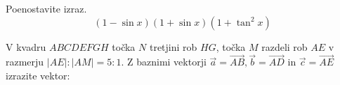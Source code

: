\documentclass[addpoints]{exam}
\begin{document}
\begin{questions}







    \question[4]
    Poenostavite izraz. 
    $$ \left(1-\sin{x}\right)\left(1+\sin{x}\right)\left(1+\tan^2{x}\right) $$

    \begin{solution}[6.5cm]
       
    \end{solution}




       


\newpage

    \question[2]
    V kvadru $ABCDEFGH$ točka $N$ tretjini rob $HG$, točka $M$ razdeli rob $AE$ v razmerju $|AE|:|AM|=5:1$.
    Z baznimi vektorji $\overrightarrow{a}=\overrightarrow{AB}, \overrightarrow{b}=\overrightarrow{AD}$ in $\overrightarrow{c}=\overrightarrow{AE}$ izrazite vektor: 


\end{questions}
\end{document}
